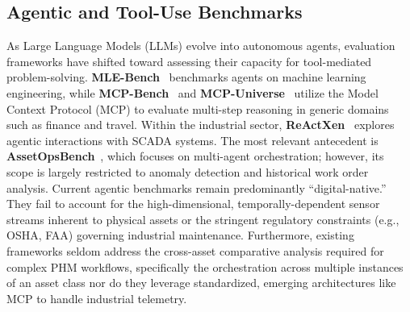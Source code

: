 \documentclass[sigconf, screen, nonacm]{acmart}
\begin{document}
\subsection{Agentic and Tool-Use Benchmarks}
As Large Language Models (LLMs) evolve into autonomous agents, evaluation frameworks have shifted toward assessing their capacity for tool-mediated problem-solving. \textbf{MLE-Bench}~\cite{chan2025mlebenchevaluatingmachinelearning} benchmarks agents on machine learning engineering, while \textbf{MCP-Bench}~\cite{wang2025mcpbenchbenchmarkingtoolusingllm} and \textbf{MCP-Universe}~\cite{luo2025mcpuniversebenchmarkinglargelanguage} utilize the Model Context Protocol (MCP) to evaluate multi-step reasoning in generic domains such as finance and travel. Within the industrial sector, \textbf{ReActXen}~\cite{patel2025react} explores agentic interactions with SCADA systems. The most relevant antecedent is \textbf{AssetOpsBench}~\cite{patel2025assetopsbenchbenchmarkingaiagents}, which focuses on multi-agent orchestration; however, its scope is largely restricted to anomaly detection and historical work order analysis. Current agentic benchmarks remain predominantly ``digital-native.'' They fail to account for the high-dimensional, temporally-dependent sensor streams inherent to physical assets or the stringent regulatory constraints (e.g., OSHA, FAA) governing industrial maintenance. Furthermore, existing frameworks seldom address the cross-asset comparative analysis required for complex PHM workflows, specifically the orchestration across multiple instances of an asset class nor do they leverage standardized, emerging architectures like MCP to handle industrial telemetry.
\end{document}
